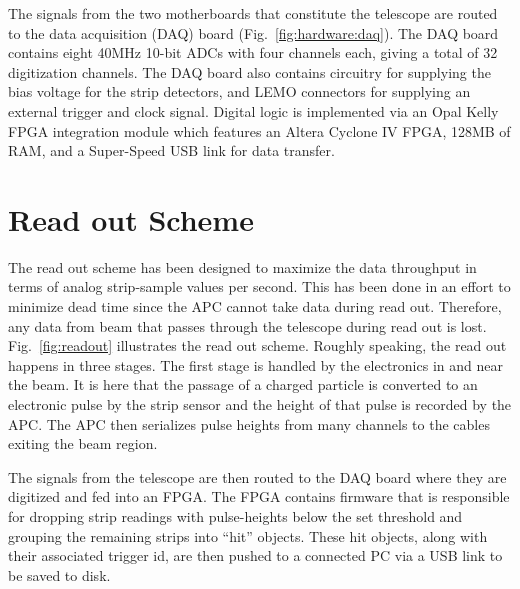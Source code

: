 \documentclass{PoS}
\begin{document}
The signals from the two motherboards that constitute the telescope are routed
to the data acquisition (DAQ) board (Fig.~\ref{fig:hardware:daq}). The DAQ board contains eight
40\si{\mega\hertz} 10-bit ADCs with four channels each, giving a total of 32
digitization channels. The DAQ board also contains circuitry for supplying the
bias voltage for the strip detectors, and LEMO connectors for supplying an
external trigger and clock signal. Digital logic is implemented via an Opal
Kelly FPGA integration module which features an Altera Cyclone IV FPGA, 128MB
of RAM, and a Super-Speed USB link for data transfer.

\section{Read out Scheme}
The read out scheme has been designed to maximize the data throughput in terms
of analog strip-sample values per second. This has been done in an effort to
minimize dead time since the APC cannot take data during read out. Therefore,
any data from beam that passes through the telescope during read out is lost.
Fig.~\ref{fig:readout} illustrates the read out scheme. Roughly speaking, the
read out happens in three stages. The first stage is handled by the electronics
in and near the beam. It is here that the passage of a charged particle is
converted to an electronic pulse by the strip sensor and the height of that
pulse is recorded by the APC. The APC then serializes pulse heights from many
channels to the cables exiting the beam region.

The signals from the telescope are then routed to the DAQ board where they are
digitized and fed into an FPGA. The FPGA contains firmware that is responsible
for dropping strip readings with pulse-heights below the set threshold and
grouping the remaining strips into ``hit'' objects. These hit objects, along
with their associated trigger id, are then pushed to a connected PC via a USB
link to be saved to disk.
\end{document}
